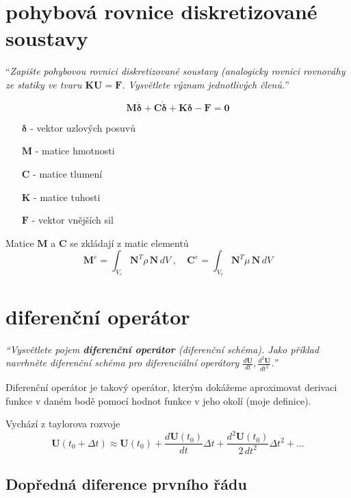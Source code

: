 \documentclass{article}
\begin{document}
	\section{pohybová rovnice diskretizované soustavy}
	``\emph{Zapište pohybovou rovnici diskretizované soustavy (analogicky rovnici rovnováhy ze statiky ve tvaru $\bm{K}\bm{U} = \bm{F}$. Vysvětlete význam jednotlivých členů.}''

	\begin{equation}
		\bm{M}\bm{\ddot{\delta}} + \bm{C}\bm{\dot{\delta}} + \bm{K}\bm{\delta} - \bm{F} = \bm{0}
	\end{equation}
	\begin{itemize}
		\item [$\bm{\delta}$] - vektor uzlových posuvů
		\item [$\bm{M}$] - matice hmotnosti
		\item [$\bm{C}$] - matice tlumení
		\item [$\bm{K}$] - matice tuhosti
		\item [$\bm{F}$] - vektor vnějších sil
	\end{itemize}
	Matice $\bm{M}$ a $\bm{C}$ se zkládají z matic elementů
	\begin{equation}
		\bm{M}^e = \int_{V_e} \bm{N}^T \rho \, \bm{N} \, dV
		\;,\quad 
		\bm{C}^e = \int_{V_e} \bm{N}^T \mu \, \bm{N} \, dV
	\end{equation}

	\section{diferenční operátor}
	\emph{``Vysvětlete pojem \textbf{diferenční operátor} (diferenční schéma). Jako příklad navrhněte diferenční schéma pro diferenciální operátory $\frac{d\bm{U}}{dt},\frac{d^2\bm{U}}{dt^2}$.''}

	Diferenční operátor je takový operátor, kterým dokážeme aproximovat derivaci funkce v daném bodě pomocí hodnot funkce v jeho okolí (moje definice).
	
	Vychází z taylorova rozvoje
	\begin{equation}
		\bm{U}(t_0+\Delta t) \approx \bm{U}(t_0) + \frac{d\bm{U}(t_0)}{dt} \Delta t + \frac{d^2\bm{U}(t_0)}{2\,dt^2} \Delta t^2 + \dots
	\end{equation}
	
	\subsection{Dopředná diference prvního řádu}
	
\end{document}
